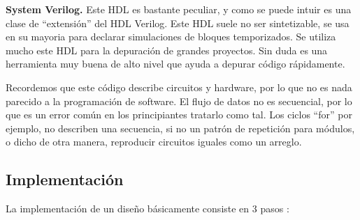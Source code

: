 \documentclass[twoside,spanish,ESP,MSc]{plantillaLabUPV}
\theoremstyle{definition}
\begin{document}

\checkmark\textbf{System Verilog.} Este HDL es bastante peculiar, y como se puede intuir es una clase de ``extensión'' del HDL Verilog. Este HDL suele no ser sintetizable, se usa en su mayoria para declarar simulaciones de bloques temporizados. Se utiliza mucho este HDL para la depuración de grandes proyectos. Sin duda es una herramienta muy buena de alto nivel que ayuda a depurar código rápidamente.





Recordemos que este código describe circuitos y hardware, por lo que no es nada parecido a la programación de software. El flujo de datos no es secuencial, por lo que es un error común en los principiantes tratarlo como tal. Los ciclos ``for'' por ejemplo, no describen una secuencia, si no un patrón de repetición para módulos, o dicho de otra manera, reproducir circuitos iguales como un arreglo.

\subsection{Implementación}%

La implementación de un diseño básicamente consiste en 3 pasos \cite{fpgaimp2, placeandroute}:

%
\end{document}
